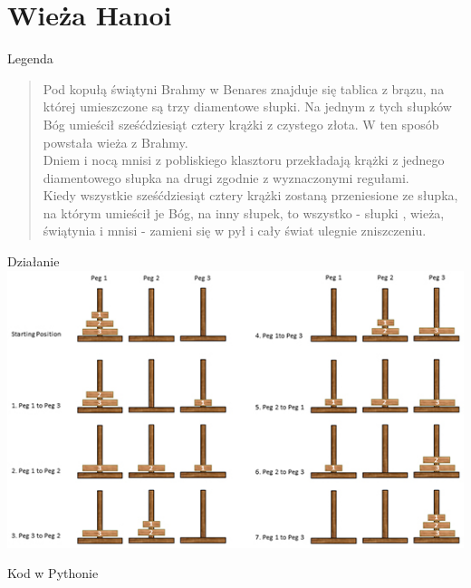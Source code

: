 \section{Wieża Hanoi}\label{sec:wieżaHanoi}
\begin{frame}{Legenda}
    \begin{quote}
        \quad Pod kopułą świątyni Brahmy w Benares znajduje się tablica z brązu, na której umieszczone są trzy diamentowe słupki. Na jednym z tych słupków Bóg umieścił sześćdziesiąt cztery krążki z czystego złota. W ten sposób powstała wieża z Brahmy. \\
        \quad Dniem i nocą mnisi z pobliskiego klasztoru przekładają krążki z jednego diamentowego słupka na drugi zgodnie z wyznaczonymi regułami. \\
        \quad Kiedy wszystkie sześćdziesiąt cztery krążki zostaną przeniesione ze słupka, na którym umieścił je Bóg, na inny słupek, to wszystko - słupki , wieża, świątynia i mnisi - zamieni się w pył i cały świat ulegnie zniszczeniu.
    \end{quote}
\end{frame}
\begin{frame}{Działanie}
    \includegraphics[width=\textwidth,height=0.8\textheight]{graphics/recursion/hanoi_tower.jpg}
\end{frame}
\begin{frame}[fragile]{Kod w Pythonie}
    
\end{frame}
